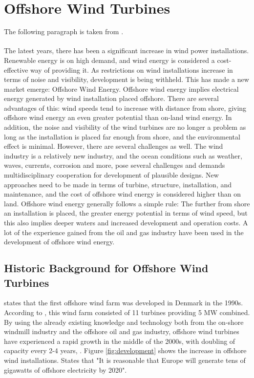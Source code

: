 \section{Offshore Wind Turbines}
The following paragraph is taken from \cite{Kapsali2012}.\\\\ The latest years, there has been a significant increase in wind power installations. Renewable energy is on high demand, and wind energy is considered a cost-effective way of providing it. As restrictions on wind installations increase in terms of noise and visibility, development is being withheld. This has made a new market emerge: Offshore Wind Energy. Offshore wind energy implies electrical energy generated by wind installation placed offshore.  There are several advantages of this: wind speeds tend to increase with distance from shore, giving offshore wind energy an even greater potential than on-land wind energy. In addition, the noise and visibility of the wind turbines are no longer a problem as long as the installation is placed far enough from shore, and the environmental effect is minimal. However, there are several challenges as well. The wind industry is a relatively new industry, and the ocean conditions such as weather, waves, currents, corrosion and more, pose several challenges and demands multidisciplinary cooperation for development of plausible designs. New approaches need to be made in terms of turbine, structure, installation, and maintenance, and the cost of offshore wind energy is considered higher than on land. Offshore wind energy generally follows a simple rule: The further from shore an installation is placed, the greater energy potential in terms of wind speed, but this also implies deeper waters and increased development and operation costs. A lot of the experience gained from the oil and gas industry have been used in the development of offshore wind energy. 

\subsection{Historic Background for Offshore Wind Turbines}
\cite{NG2016} states that the first offshore wind farm was developed in Denmark in the 1990s. According to \cite{Lynn2011}, this wind farm consisted of 11 turbines providing 5 MW combined.  By using the already existing knowledge and technology both from the on-shore windmill industry and the offshore oil and gas industry, offshore wind turbines have experienced a rapid growth in the middle of the 2000s, with doubling of capacity every 2-4 years, \cite{NG2016}. Figure \ref{fig:development} shows the increase in offshore wind installations. \cite{Lynn2011} States that "It is reasonable that Europe will generate tens of gigawatts of offshore electricity by 2020".


